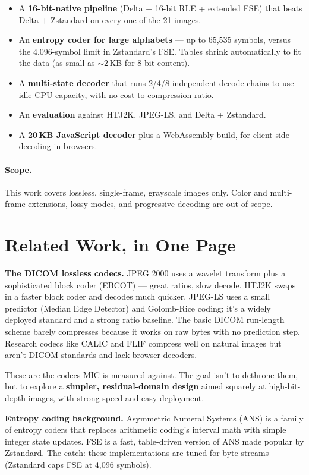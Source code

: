 \documentclass[11pt]{article}
\begin{document}
\begin{itemize}
  \item A \textbf{16-bit-native pipeline} (Delta + 16-bit RLE + extended FSE)
  that beats Delta + Zstandard on every one of the 21 images.
  \item An \textbf{entropy coder for large alphabets} --- up to 65,535 symbols,
  versus the 4,096-symbol limit in Zstandard's FSE. Tables shrink
  automatically to fit the data (as small as ${\sim}2$\,KB for 8-bit content).
  \item A \textbf{multi-state decoder} that runs 2/4/8 independent decode chains
  to use idle CPU capacity, with no cost to compression ratio.
  \item An \textbf{evaluation} against HTJ2K, JPEG-LS, and Delta + Zstandard.
  \item A \textbf{20\,KB JavaScript decoder} plus a WebAssembly build, for
  client-side decoding in browsers.
\end{itemize}

\paragraph{Scope.} This work covers lossless, single-frame, grayscale images
only. Color and multi-frame extensions, lossy modes, and progressive decoding
are out of scope.

\section{Related Work, in One Page}

\textbf{The DICOM lossless codecs.} JPEG 2000 uses a wavelet transform plus a
sophisticated block coder (EBCOT) --- great ratios, slow decode. HTJ2K swaps
in a faster block coder and decodes much quicker. JPEG-LS uses a small
predictor (Median Edge Detector) and Golomb-Rice coding; it's a widely
deployed standard and a strong ratio baseline. The basic DICOM run-length
scheme barely compresses because it works on raw bytes with no prediction
step. Research codecs like CALIC and FLIF compress well on natural images
but aren't DICOM standards and lack browser decoders.

These are the codecs MIC is measured against. The goal isn't to dethrone
them, but to explore a \textbf{simpler, residual-domain design} aimed squarely
at high-bit-depth images, with strong speed and easy deployment.

\textbf{Entropy coding background.} Asymmetric Numeral Systems (ANS) is a
family of entropy coders that replaces arithmetic coding's interval math with
simple integer state updates. FSE is a fast, table-driven version of ANS
made popular by Zstandard. The catch: these implementations are tuned for
byte streams (Zstandard caps FSE at 4,096 symbols).
\end{document}
